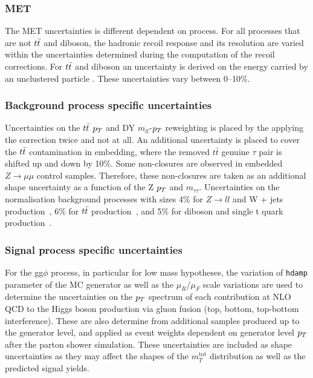 \subsubsection{MET}
The MET uncertainties is different dependent on process.
For all processes that are not $t\bar{t}$ and diboson, the hadronic recoil response and its resolution are varied within the uncertainties determined during the computation of the recoil corrections.
For $t\bar{t}$ and diboson an uncertainty is derived on the energy carried by an unclustered particle \cite{Sirunyan:2019kia}.
These uncertainties vary between 0--10\%.

\subsubsection{Background process specific uncertainties}
Uncertainties on the $t\bar{t}$ $p_{T}$ and DY $m_{ll}$-$p_{T}$ reweighting is placed by the applying the correction twice and not at all.
An additional uncertainty is placed to cover the $t\bar{t}$ contamination in embedding, where the removed $t\bar{t}$ genuine $\tau$ pair is shifted up and down by 10\%.
Some non-closures are observed in embedded $Z\to\mu\mu$ control samples. 
Therefore, these non-closures are taken as an additional shape uncertainty as a function of the Z $p_{T}$ and $m_{\tau\tau}$.
Uncertainties on the normalisation background processes with sizes 4\% for $Z\rightarrow ll$ and W + jets production~\cite{Melnikov:2006kv}, 6\% for 
$t\bar{t}$ production~\cite{Czakon:2011xx,Kidonakis:2013zqa}, and 5\% for diboson and single t quark production~\cite{Kidonakis:2013zqa,Campbell:2011bn,Gehrmann:2014fva}.

\subsubsection{Signal process specific uncertainties}
For the gg$\phi$ process, in particular for low mass hypotheses, the variation of \texttt{hdamp} parameter of the \POWHEG MC generator as well as the $\mu_{R}$/$\mu_{F}$ scale variations are used to determine the uncertainties
on the $p_{T}$ spectrum of each contribution at NLO QCD to the Higgs boson production via gluon fusion (top, bottom, top-bottom interference). These are also determine from additional samples produced
up to the generator level, and applied as event weights dependent on generator level $p_{T}$ after the parton shower simulation. These uncertainties are included as shape uncertainties as they may affect the shapes of the $m_{T}^{\text{tot}}$ distribution as well as the predicted signal yields.

